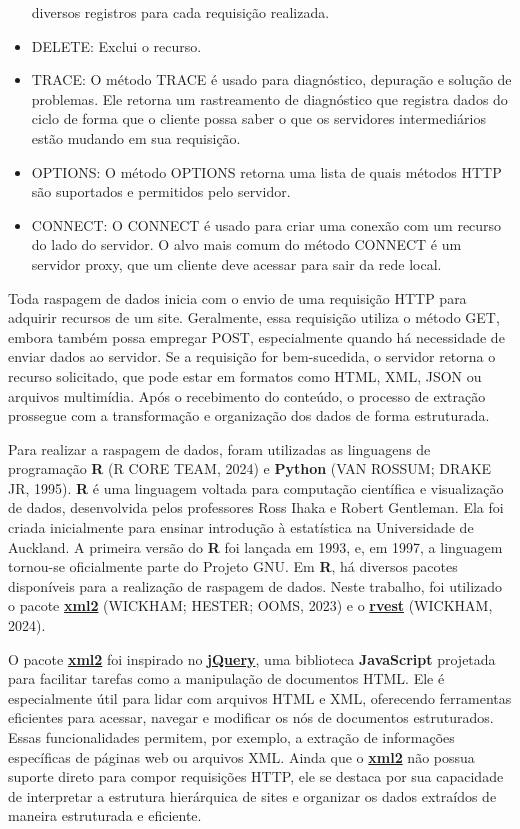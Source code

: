 \documentclass[
  12pt,
  a4paper,
]{scrreprt}
\begin{document}
\begin{itemize}
  diversos registros para cada requisição realizada.
\item
  DELETE: Exclui o recurso.
\item
  TRACE: O método TRACE é usado para diagnóstico, depuração e solução de
  problemas. Ele retorna um rastreamento de diagnóstico que registra
  dados do ciclo de forma que o cliente possa saber o que os servidores
  intermediários estão mudando em sua requisição.
\item
  OPTIONS: O método OPTIONS retorna uma lista de quais métodos HTTP são
  suportados e permitidos pelo servidor.
\item
  CONNECT: O CONNECT é usado para criar uma conexão com um recurso do
  lado do servidor. O alvo mais comum do método CONNECT é um servidor
  proxy, que um cliente deve acessar para sair da rede local.
\end{itemize}

Toda raspagem de dados inicia com o envio de uma requisição HTTP para
adquirir recursos de um site. Geralmente, essa requisição utiliza o
método GET, embora também possa empregar POST, especialmente quando há
necessidade de enviar dados ao servidor. Se a requisição for
bem-sucedida, o servidor retorna o recurso solicitado, que pode estar em
formatos como HTML, XML, JSON ou arquivos multimídia. Após o recebimento
do conteúdo, o processo de extração prossegue com a transformação e
organização dos dados de forma estruturada.

\vspace{12pt}

Para realizar a raspagem de dados, foram utilizadas as linguagens de
programação \textbf{R} (R CORE TEAM, 2024) e \textbf{Python} (VAN
ROSSUM; DRAKE JR, 1995). \textbf{R} é uma linguagem voltada para
computação científica e visualização de dados, desenvolvida pelos
professores Ross Ihaka e Robert Gentleman. Ela foi criada inicialmente
para ensinar introdução à estatística na Universidade de Auckland. A
primeira versão do \textbf{R} foi lançada em 1993, e, em 1997, a
linguagem tornou-se oficialmente parte do Projeto GNU. Em \textbf{R}, há
diversos pacotes disponíveis para a realização de raspagem de dados.
Neste trabalho, foi utilizado o pacote
\href{https://xml2.r-lib.org/}{\textbf{xml2}} (WICKHAM; HESTER; OOMS,
2023) e o \href{https://rvest.tidyverse.org/}{\textbf{rvest}} (WICKHAM,
2024).

\vspace{12pt}

O pacote \href{https://xml2.r-lib.org/}{\textbf{xml2}} foi inspirado no
\href{https://jquery.com/}{\textbf{jQuery}}, uma biblioteca
\textbf{JavaScript} projetada para facilitar tarefas como a manipulação
de documentos HTML. Ele é especialmente útil para lidar com arquivos
HTML e XML, oferecendo ferramentas eficientes para acessar, navegar e
modificar os nós de documentos estruturados. Essas funcionalidades
permitem, por exemplo, a extração de informações específicas de páginas
web ou arquivos XML. Ainda que o
\href{https://xml2.r-lib.org/}{\textbf{xml2}} não possua suporte direto
para compor requisições HTTP, ele se destaca por sua capacidade de
interpretar a estrutura hierárquica de sites e organizar os dados
extraídos de maneira estruturada e eficiente.
\end{document}
